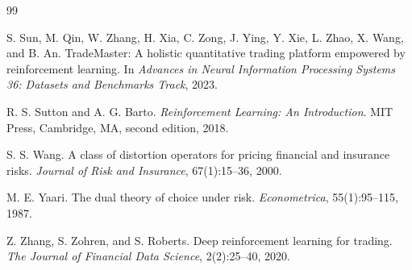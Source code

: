 \documentclass[10pt,twocolumn]{article}
\begin{document}
\begin{thebibliography}{99}

S. Sun, M. Qin, W. Zhang, H. Xia, C. Zong, J. Ying, Y. Xie, L. Zhao,
  X. Wang, and B. An.
\newblock TradeMaster: A holistic quantitative trading platform empowered by
  reinforcement learning.
\newblock In \emph{Advances in Neural Information Processing Systems 36:
  Datasets and Benchmarks Track}, 2023.


R. S. Sutton and A. G. Barto.
\newblock \emph{Reinforcement Learning: An Introduction}.
\newblock MIT Press, Cambridge, MA, second edition, 2018.


S. S. Wang.
\newblock A class of distortion operators for pricing financial and insurance risks.
\newblock \emph{Journal of Risk and Insurance}, 67(1):15--36, 2000.


M. E. Yaari.
\newblock The dual theory of choice under risk.
\newblock \emph{Econometrica}, 55(1):95--115, 1987.


Z. Zhang, S. Zohren, and S. Roberts.
\newblock Deep reinforcement learning for trading.
\newblock \emph{The Journal of Financial Data Science}, 2(2):25--40, 2020.

\end{thebibliography}
\end{document}
